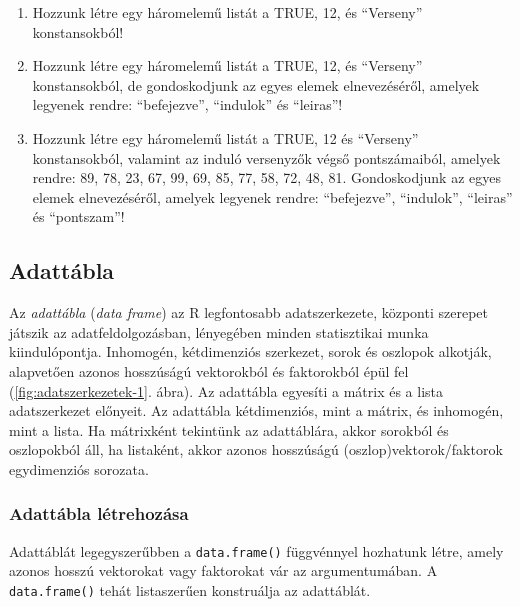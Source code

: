 \documentclass[
]{book}
\makeatletter
\providecommand{\tightlist}{%
  \setlength{\itemsep}{0pt}\setlength{\parskip}{0pt}}
\newenvironment{kframe}{%
\medskip{}
\setlength{\fboxsep}{.8em}
 \def\at@end@of@kframe{}%
 \ifinner\ifhmode%
  \def\at@end@of@kframe{\end{minipage}}%
  \begin{minipage}{\columnwidth}%
 \fi\fi%
 \def\FrameCommand##1{\hskip\@totalleftmargin \hskip-\fboxsep
 \colorbox{shadecolor}{##1}\hskip-\fboxsep
     \hskip-\linewidth \hskip-\@totalleftmargin \hskip\columnwidth}%
 \MakeFramed {\advance\hsize-\width
   \@totalleftmargin\z@ \linewidth\hsize
   \@setminipage}}%
 {\par\unskip\endMakeFramed%
 \at@end@of@kframe}
\newenvironment{rmdblock}[1]
  {
  \begin{itemize}
  \renewcommand{\labelitemi}{
    \raisebox{-.7\height}[0pt][0pt]{
      {\setkeys{Gin}{width=3em,keepaspectratio}\texttt{[image: images/\#1]}}
    }
  }
  \setlength{\fboxsep}{1em}
  \begin{kframe}
  \item
  }
  {
  \end{kframe}
  \end{itemize}
  }
\newenvironment{rmdexercise}
  {\begin{rmdblock}{exercise}}
  {\end{rmdblock}}
\makeatother
\begin{document}
\begin{rmdexercise}
\begin{enumerate}
\def\labelenumi{\arabic{enumi}.}
\tightlist
\item
  Hozzunk létre egy háromelemű listát a TRUE, 12, és ``Verseny'' konstansokból!
\item
  Hozzunk létre egy háromelemű listát a TRUE, 12, és ``Verseny'' konstansokból, de gondoskodjunk az egyes elemek elnevezéséről, amelyek legyenek rendre: ``befejezve'', ``indulok'' és ``leiras''!
\item
  Hozzunk létre egy háromelemű listát a TRUE, 12 és ``Verseny'' konstansokból, valamint az induló versenyzők végső pontszámaiból, amelyek rendre: 89, 78, 23, 67, 99, 69, 85, 77, 58, 72, 48, 81. Gondoskodjunk az egyes elemek elnevezéséről, amelyek legyenek rendre: ``befejezve'', ``indulok'', ``leiras'' és ``pontszam''!
\end{enumerate}
\end{rmdexercise}

\hypertarget{adattuxe1bla}{%
\subsection{Adattábla}\label{adattuxe1bla}}

Az \emph{adattábla} (\emph{data frame}) az R legfontosabb adatszerkezete, központi szerepet játszik az adatfeldolgozásban, lényegében minden statisztikai munka kiindulópontja. Inhomogén, kétdimenziós szerkezet, sorok és oszlopok alkotják, alapvetően azonos hosszúságú vektorokból és faktorokból épül fel (\ref{fig:adatszerkezetek-1}. ábra). Az adattábla egyesíti a mátrix és a lista adatszerkezet előnyeit. Az adattábla kétdimenziós, mint a mátrix, és inhomogén, mint a lista. Ha mátrixként tekintünk az adattáblára, akkor sorokból és oszlopokból áll, ha listaként, akkor azonos hosszúságú (oszlop)vektorok/faktorok egydimenziós sorozata.

\hypertarget{adattuxe1bla-luxe9trehozuxe1sa}{%
\subsubsection{Adattábla létrehozása}\label{adattuxe1bla-luxe9trehozuxe1sa}}

Adattáblát legegyszerűbben a \texttt{data.frame()} függvénnyel hozhatunk létre, amely azonos hosszú vektorokat vagy faktorokat vár az argumentumában. A \texttt{data.frame()} tehát listaszerűen konstruálja az adattáblát.
\end{document}
